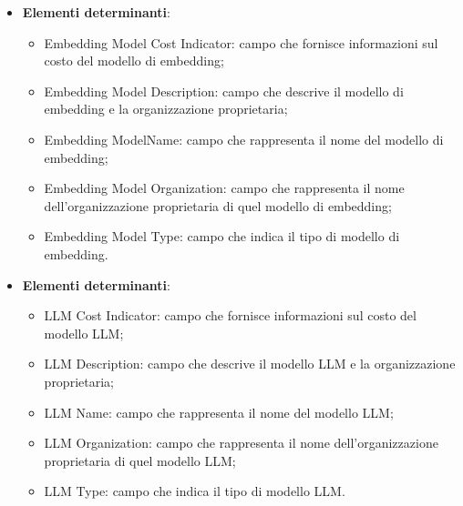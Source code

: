 \documentclass[10pt, a4paper]{article}
\begin{document}
\label{EmbeddingModelCardDettaglio}
\begin{itemize}
    \item \textbf{Elementi determinanti}:
     \begin{itemize}
        \item Embedding Model Cost Indicator: campo che fornisce informazioni sul costo del modello di embedding;
        \item Embedding Model Description: campo che descrive il modello di embedding e la organizzazione proprietaria;
        \item Embedding ModelName: campo che rappresenta il nome del modello di embedding;
        \item Embedding Model Organization: campo che rappresenta il nome dell'organizzazione proprietaria di quel modello di embedding;
        \item Embedding Model Type: campo che indica il tipo di modello di embedding.
        
    \end{itemize}
\end{itemize}


\label{LLMCardDettaglio}
\begin{itemize}
    \item \textbf{Elementi determinanti}:
     \begin{itemize}
        \item LLM Cost Indicator: campo che fornisce informazioni sul costo del modello LLM;
        \item LLM Description: campo che descrive il modello LLM e la organizzazione proprietaria;
        \item LLM Name: campo che rappresenta il nome del modello LLM;
        \item LLM Organization: campo che rappresenta il nome dell'organizzazione proprietaria di quel modello LLM;
        \item LLM Type: campo che indica il tipo di modello LLM.
        
    \end{itemize}
\end{itemize}
\end{document}
